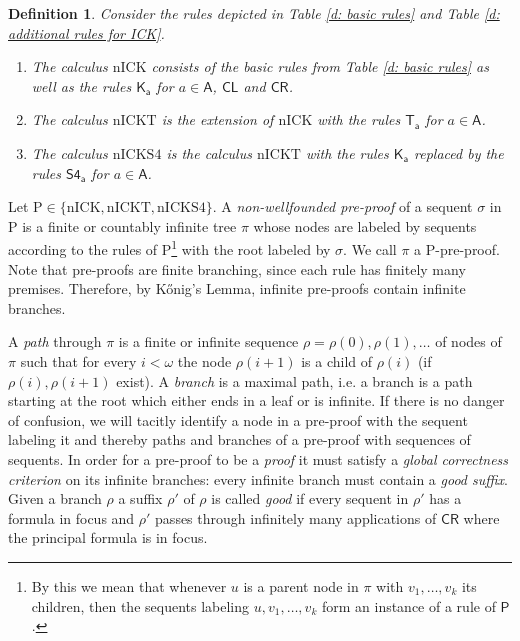 \documentclass{myifcolog}
\newcommand\C {C}
\newcommand{\K}{K}
\newcommand\A{\mathsf{A}}
\newcommand{\agi}{a}
\newcommand{\hickp}{\mathrm{P}}
\newcommand{\nick}{\mathrm{nICK}}
\newcommand{\nickt}{\mathrm{nICKT}}
\newcommand{\nicks}{\mathrm{nICKS4}}
\newcommand{\nickss}{\mathrm{nICKS5}}
\newtheorem{definition}[theorem]{Definition}
\numberwithin{theorem}{section}
\begin{document}
\begin{definition}
    Consider the rules depicted in Table \ref{d: basic rules} and Table \ref{d: additional rules for ICK}. 
    \begin{enumerate}
        \item The calculus $\nick$ consists of the basic rules from Table \ref{d: basic rules} as well as the rules $\mathsf{\K_\agi}$ for $\agi \in \A$, $\mathsf{\C L}$ and $ \mathsf{\C R}$.
        \item The calculus $\nickt$ is the extension of $\nick$ with the rules $\mathsf{T_\agi}$ for $\agi \in \A$.
        \item The calculus $\nicks$ is the calculus  $\nickt$ with the rules $\mathsf{\K_\agi}$ replaced by the rules $\mathsf{S4_\agi}$ for $\agi \in \A$.
    \end{enumerate}
\end{definition}


Let $\hickp \in \{\nick, \nickt, \nicks\}$. A \emph{non-wellfounded pre-proof} of a sequent $\sigma$ in $\hickp$ is a finite or countably infinite tree $\pi$ whose nodes are labeled by sequents according to the rules of $\hickp$\footnote{By this we mean that whenever $u$ is a parent node in $\pi$ with $v_1, \ldots, v_k$ its children, then the sequents labeling $u, v_1, \ldots, v_k$ form an instance of a rule of $\mathsf{P}$.} with the root labeled by $\sigma$. We call $\pi$ a $\hickp$-pre-proof. Note that pre-proofs are finite branching, since each rule has finitely many premises. Therefore, by K\H{o}nig's Lemma, infinite pre-proofs contain infinite branches. 

A \emph{path} through $\pi$ is a finite or infinite sequence $\rho = \rho(0), \rho(1), \ldots$ of nodes of $\pi$ such that for every $i < \omega$ the node $\rho(i+1)$ is a child of $\rho(i)$ (if $\rho(i), \rho(i+1)$ exist). A \emph{branch} is a maximal path, i.e. a branch is a path starting at the root which either ends in a leaf or is infinite. If there is no danger of confusion, we will tacitly identify a node in a pre-proof with the sequent labeling it and thereby paths and branches of a pre-proof with sequences of sequents. In order for a pre-proof to be a \emph{proof} it must satisfy a \emph{global correctness criterion} on its infinite branches: every infinite branch must contain a \emph{good suffix}. Given a branch $\rho$ a suffix $\rho'$ of $\rho$ is called \emph{good} if every sequent in $\rho'$ has a formula in focus and $\rho'$ passes through infinitely many applications of $\mathsf{\C R}$ where the principal formula is in focus. 
\end{document}
